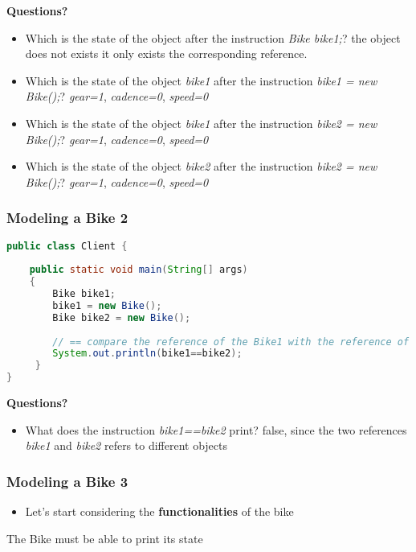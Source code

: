 \documentclass{article}
\theoremstyle{definition}
\begin{document}
\textbf{Questions?}\\
\begin{itemize}
\item Which is the state of the object after the instruction \emph{Bike bike1;}? the object does not exists it only exists the corresponding reference.
\item Which is the state of the object \emph{bike1} after the instruction \emph{bike1 = new Bike();}? \emph{gear=1}, \emph{cadence=0}, \emph{speed=0}
\item Which is the state of the object \emph{bike1} after the instruction \emph{bike2 = new Bike();}? \emph{gear=1}, \emph{cadence=0}, \emph{speed=0}
\item Which is the state of the object \emph{bike2} after the instruction \emph{bike2 = new Bike();}? \emph{gear=1}, \emph{cadence=0}, \emph{speed=0}
\end{itemize}



\subsubsection{Modeling a Bike 2}
\begin{lstlisting}[language=Java,escapechar=|]
public class Client {
	
	public static void main(String[] args)
    {
        Bike bike1; 
        bike1 = new Bike();
        Bike bike2 = new Bike(); 
        
        // == compare the reference of the Bike1 with the reference of the Bike2
        System.out.println(bike1==bike2);
     }
}
\end{lstlisting}

\textbf{Questions?}\\
\begin{itemize}
\item What does the instruction \emph{bike1==bike2} print? false, since the two references \emph{bike1} and \emph{bike2} refers to different objects
\end{itemize}

\subsubsection{Modeling a Bike 3}
\begin{itemize}
\item Let's start considering the \textbf{functionalities} of the bike
\end{itemize}
The Bike must be able to print its state
\end{document}
